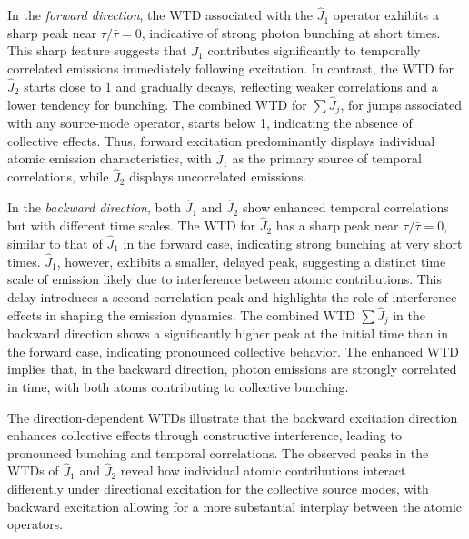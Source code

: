 \documentclass[aps,prl,twocolumn,superscriptaddress,showpacs,amsmath,amssymb]{revtex4-2}
\begin{document}
In the \textit{forward direction}, the WTD associated with the $ \hat{J}_1 $ operator exhibits a sharp peak near $ \tau / \bar{\tau} = 0 $, indicative of strong photon bunching at short times. This sharp feature suggests that $ \hat{J}_1 $ contributes significantly to temporally correlated emissions
immediately following excitation. In contrast, the WTD for $ \hat{J}_2 $ starts close to 1 and gradually decays, reflecting weaker correlations and a lower tendency for bunching. The combined WTD for $ \sum \hat{J}_j $, for jumps associated with any source-mode operator, starts below 1, indicating the absence of collective effects. Thus, forward excitation predominantly displays individual atomic emission characteristics, with $ \hat{J}_1 $ as the primary source of temporal correlations, while $ \hat{J}_2 $ displays uncorrelated emissions.

In the \textit{backward direction}, both $ \hat{J}_1 $ and $ \hat{J}_2 $ show enhanced temporal correlations but with different time scales. The WTD for $ \hat{J}_2 $ has a sharp peak near $ \tau / \bar{\tau} = 0 $, similar to that of $ \hat{J}_1 $ in the forward case, indicating strong bunching at
very short times. $ \hat{J}_1 $, however, exhibits a smaller, delayed peak, suggesting a distinct time scale of emission likely due to interference between atomic contributions. This delay introduces a second correlation peak and highlights the role of interference effects in shaping the emission
dynamics. The combined WTD $ \sum \hat{J}_j $ in the backward direction shows a significantly higher peak at the initial time than in the forward case, indicating pronounced collective behavior. The enhanced WTD implies that, in the backward direction, photon emissions are strongly correlated in time, with both atoms contributing to collective bunching.

The direction-dependent WTDs illustrate that the backward excitation direction enhances collective effects through constructive interference, leading to pronounced bunching and temporal correlations. The observed peaks in the WTDs of $ \hat{J}_1 $ and $ \hat{J}_2 $ reveal how individual atomic contributions interact differently under directional excitation for the collective source modes, with backward excitation allowing for a more substantial interplay between the atomic operators.
\end{document}
